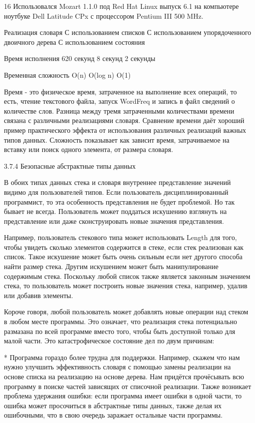 16 Использовался Mozart 1.1.0 под Red Hat Linux выпуск 6.1 на компьютере ноутбуке Dell Latitude CPx с процессором Pentium III 500 MHz.

Реализация словаря
С использованием списков
С использованием упорядоченного двоичного дерева
С использованием состояния

Время исполнения
620 секунд
8 секунд
2 секунды

Временная сложность
O(n)
O(log n)
O(1)

Время - это физическое время, затраченное на выполнение всех операций, то есть, чтение текстового файла, запуск WordFreq и запись в файл сведений о количестве слов. Разница между тремя затраченными количествами времени связана с различными реализациями словаря. Сравнение времени даёт хороший пример практического эффекта от использования различных реализаций важных типов данных. Сложность показывает как зависит время, затрачиваемое на вставку или поиск одного элемента, от размера словаря.

3.7.4 Безопасные абстрактные типы данных

В обоих типах данных стека и словаря внутреннее представление значений видимо для пользователей типов. Если пользователь дисциплинированный программист, то эта особенность представления не будет проблемой. Но так бывает не всегда. Пользователь может поддаться искушению взглянуть на представление или даже сконструировать новые значения представления.

Например, пользователь стекового типа может использовать Length для того, чтобы увидеть сколько элементов содержится в стеке, если стек реализован как список. Такое искушение может быть очень сильным если нет другого способа найти размер стека. Другим искушением может быть манипулирование содержимым стека. Поскольку любой список также является законным значением стека, то пользователь может построить новые значения стека, например, удалив или добавив элементы.

Короче говоря, любой пользователь может добавлять новые операции над стеком в любом месте программы. Это означает, что реализация стека потенциально размазана по всей программе вместо того, чтобы быть доступной только для малой части. Это катастрофическое состояние дел по двум причинам:

* Программа гораздо более трудна для поддержки. Например, скажем что нам нужно улучшить эффективность словаря с помощью замены реализации на основе списка на реализацию на основе дерева. Нам придётся прочёсывать всю программу в поиске частей зависящих от списочной реализации. Также возникает проблема удержания ошибки: если программа имеет ошибки в одной части, то ошибка может просочиться в абстрактные типы данных, также делая их ошибочными, что в свою очередь заражает остальные части программы.

